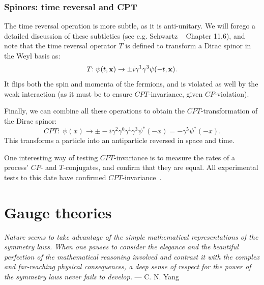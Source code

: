 \subsubsection{Spinors: time reversal and CPT}

The time reversal operation is more subtle, as it is anti-unitary.
We will forego a detailed discussion of these subtleties (see e.g. Schwartz ~\cite{Schwartz:2014sze} Chapter 11.6), and note that the time reversal operator $T$ is defined to transform a Dirac spinor in the Weyl basis as:
\begin{equation}
	\label{eq:01_qft_spinors_cpt_time_reversal}
	T\mathrm{:\;} \psi(t, \mathbf{x}) \rightarrow \pm i\gamma^1\gamma^3\psi(-t, \mathbf{x}).
\end{equation}
It flips both the spin and momenta of the fermions, and is violated as well by the weak interaction (as it must be to ensure $CPT$-invariance, given $CP$-violation).

Finally, we can combine all these operations to obtain the $CPT$-transformation of the Dirac spinor:
\begin{equation}
	\label{eq:01_qft_spinors_cpt_cpt}
	CPT\mathrm{:\;} \psi(x) \rightarrow \pm -i\gamma^2\gamma^0\gamma^1\gamma^3\psi^*(-x) = -\gamma^5\psi^*(-x).
\end{equation}
This transforms a particle into an antiparticle reversed in space and time.

One interesting way of testing $CPT$-invariance is to measure the rates of a process' $CP$- and $T$-conjugates, and confirm that they are equal.
All experimental tests to this date have confirmed $CPT$-invariance~\cite{ParticleDataGroup:2024cfk}.


\section{Gauge theories}
\label{sec:01_qft_gt}

{
	\noindent
	\textit{Nature seems to take advantage of the simple mathematical representations of the symmetry laws. 
	When one pauses to consider the elegance and the beautiful perfection of the mathematical reasoning involved and contrast it with the complex and far-reaching physical consequences, a deep sense of respect for the power of the symmetry laws never fails to develop.} --- C. N. Yang
}

\

